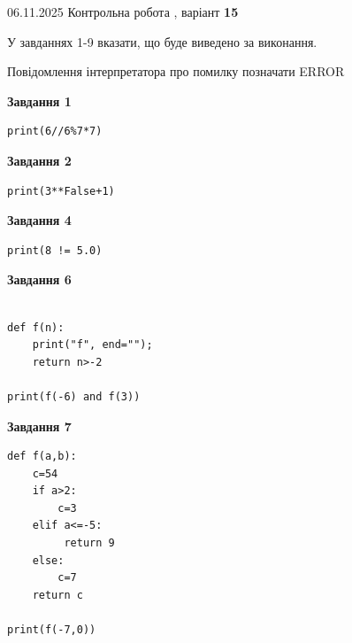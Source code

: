 \documentclass[12pt, ukrainian]{article}
\begin{document}
{\Large{06.11.2025 Контрольна робота , варіант  \No \textbf { 15 }\par}}
{
\begin {large}
У завданнях 1-9 вказати, що буде виведено за виконання.

Повідомлення інтерпретатора про помилку позначати ERROR

\begin{minipage}[t]{7.5cm}

\begin{center}
\textbf{Завдання 1}
\end{center}

\begin{verbatim}
print(6//6%7*7)
\end{verbatim}



\begin{center}
\textbf{Завдання 2}
\end{center}

\begin{verbatim}
print(3**False+1)
\end{verbatim}



\begin{center}
\textbf{Завдання 4}
\end{center}

\begin{verbatim}
print(8 != 5.0)
\end{verbatim}



\begin{center}
\textbf{Завдання 6}
\end{center}

\begin{verbatim}

def f(n):
    print("f", end="");
    return n>-2

print(f(-6) and f(3))
\end{verbatim}



\begin{center}
\textbf{Завдання 7}
\end{center}

\begin{verbatim}
def f(a,b):
    c=54
    if a>2:
        c=3
    elif a<=-5:
         return 9
    else: 
        c=7
    return c

print(f(-7,0))
\end{verbatim}


\end{minipage}
\end{large}}
\end{document}
